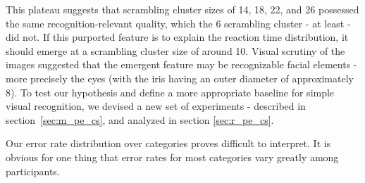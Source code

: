 	    This plateau suggests that scrambling cluster sizes of \SI{14}{\pixel}, \SI{18}{\pixel}, \SI{22}{\pixel}, and \SI{26}{\pixel} possessed the same recognition-relevant quality, which the \SI{6}{\pixel} scrambling cluster - at least - did not.
	    If this purported feature is to explain the reaction time distribution, it should emerge at a scrambling cluster size of around \SI{10}{\pixel}.
	    Visual scrutiny of the images suggested that the emergent feature may be recognizable facial elements - more precisely the eyes (with the iris having an outer diameter of approximately \SI{8}{\pixel}).
	    To test our hypothesis and define a more appropriate baseline for simple visual recognition, we devised a new set of experiments - described in section~\ref{sec:m_pe_cs}, and analyzed in section \ref{sec:r_pe_cs}.

	    Our error rate distribution over categories proves difficult to interpret.
	    It is obvious for one thing that error rates for most categories vary greatly among participants.
